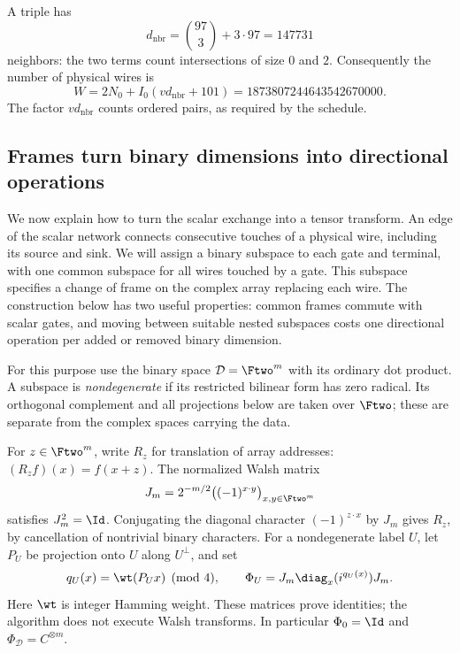 A triple has
\[
 d_{\mathrm{nbr}}=\binom{97}{3}+3\cdot97=147731
\]
neighbors: the two terms count intersections of size $0$ and $2$.
Consequently the number of physical wires is
\begin{equation}\label{net:wire-count}
 W=2N_0+I_0(vd_{\mathrm{nbr}}+101)
   =1873807244643542670000.
\end{equation}
The factor $vd_{\mathrm{nbr}}$ counts ordered pairs, as required by
the schedule.

\subsection{Frames turn binary dimensions into directional operations}

We now explain how to turn the scalar exchange into a tensor transform.
An edge of the scalar network connects consecutive touches of a physical
wire, including its source and sink.  We will assign a binary subspace
to each gate and terminal, with one common subspace for all wires touched
by a gate.  This subspace specifies a change of frame on the complex
array replacing each wire.  The construction below has two useful
properties: common frames commute with scalar gates, and moving between
suitable nested subspaces costs one directional operation per added or
removed binary dimension.

For this purpose use the binary space $\mathcal D=\Ftwo^m$ with its
ordinary dot product.  A subspace is \emph{nondegenerate} if its restricted
bilinear form has zero radical.  Its orthogonal complement and all
projections below are taken over $\Ftwo$; these are separate from the
complex spaces carrying the data.

For $z\in\Ftwo^m$, write $R_z$ for translation of array addresses:
$(R_zf)(x)=f(x+z)$.  The normalized Walsh matrix
\[
 J_m=2^{-m/2}\bigl((-1)^{x\cdot y}\bigr)_{x,y\in\Ftwo^m}
\]
satisfies $J_m^2=\Id$.  Conjugating the diagonal character
$(-1)^{z\cdot x}$ by $J_m$ gives $R_z$, by cancellation of
nontrivial binary characters.  For a nondegenerate label $U$, let
$P_U$ be projection onto $U$ along $U^\perp$, and set
\begin{equation}\label{net:frame}
 q_U(x)=\wt(P_Ux)\pmod4,\qquad
 \Phi_U=J_m\diag_x(i^{q_U(x)})J_m.
\end{equation}
Here $\wt$ is integer Hamming weight.  These matrices prove
identities; the algorithm does not execute Walsh transforms.
In particular $\Phi_0=\Id$ and $\Phi_{\mathcal D}=C^{\otimes m}$.

